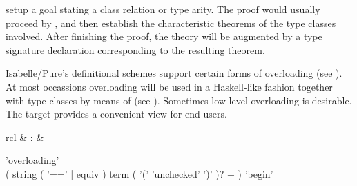 \begin{isabellebody}
\begin{isamarkuptext}
\begin{descr}
  \item [\hyperlink{command.instance}{\mbox{\isa{\isacommand{instance}}}}~\isa{{\isachardoublequote}c\isactrlsub {\isadigit{1}}\ {\isasymsubseteq}\ c\isactrlsub {\isadigit{2}}{\isachardoublequote}} and
  \hyperlink{command.instance}{\mbox{\isa{\isacommand{instance}}}}~\isa{{\isachardoublequote}t\ {\isacharcolon}{\isacharcolon}\ {\isacharparenleft}s\isactrlsub {\isadigit{1}}{\isacharcomma}\ {\isasymdots}{\isacharcomma}\ s\isactrlsub n{\isacharparenright}\ s{\isachardoublequote}}]
  setup a goal stating a class relation or type arity.  The proof
  would usually proceed by \hyperlink{method.intro_classes}{\mbox{}}, and then establish
  the characteristic theorems of the type classes involved.  After
  finishing the proof, the theory will be augmented by a type
  signature declaration corresponding to the resulting theorem.

  \end{descr}%
\end{isamarkuptext}%
\isamarkuptrue%
%
\isamarkuptrue%
%
\begin{isamarkuptext}%
Isabelle/Pure's definitional schemes support certain forms of
  overloading (see ).  At most occassions
  overloading will be used in a Haskell-like fashion together with
  type classes by means of \hyperlink{command.instantiation}{\mbox{}} (see
  ).  Sometimes low-level overloading is desirable.
  The \hyperlink{command.overloading}{\mbox{}} target provides a convenient view for
  end-users.

  \begin{matharray}{rcl}
    \hypertarget{command.overloading}{\hyperlink{command.overloading}{\mbox{}}} & : &  \\
  \end{matharray}

  \begin{rail}
    'overloading' \\
    ( string ( '==' | equiv ) term ( '(' 'unchecked' ')' )? + ) 'begin'
  \end{rail}

  \begin{descr}


\end{descr}
\end{isamarkuptext}
\end{isabellebody}
